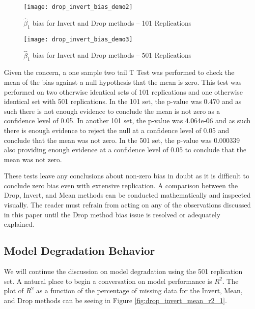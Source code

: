 \documentclass[../paper.tex]{subfiles}
\begin{document}
\begin{figure}[H]

\centering
\texttt{[image: drop\_invert\_bias\_demo2]}
\caption{$\hat{\beta}_{1}$ bias for Invert and Drop methods -- 101 Replications}
\label{fig:drop_invert_bias_demo2}
\end{figure}

\begin{figure}[H]

\centering
\texttt{[image: drop\_invert\_bias\_demo3]}
\caption{$\hat{\beta}_{1}$  bias for Invert and Drop methods -- 501 Replications}
\label{fig:drop_invert_bias_demo3}
\end{figure}

Given the concern, a one sample two tail T Test was performed to check the mean of the bias against a null hypothesis that the mean is zero.
This test was performed on two otherwise identical sets of 101 replications and one otherwise identical set with 501 replications.
In the 101 set, the p-value was 0.470 and as such there is not enough evidence to conclude the mean is not zero as a confidence level of 0.05.
In another 101 set, the p-value was 4.064e-06 and as such there is enough evidence to reject the null at a confidence level of 0.05 and conclude that the mean was not zero.
In the 501 set, the p-value was 0.000339 also providing enough evidence at a confidence level of 0.05 to conclude that the mean was not zero.

These tests leave any conclusions about non-zero bias in doubt as it is difficult to conclude zero bias even with extensive replication. A comparison between the Drop, Invert, and Mean methods can be conducted mathematically and inspected visually. The reader must refrain from acting on any of the observations discussed in this paper until the Drop method bias issue is resolved or adequately explained.

\subsection{Model Degradation Behavior}
We will continue the discussion on model degradation using the 501 replication set.
A natural place to begin a conversation on model performance is $R^2$.
The plot of $R^2$ as a function of the percentage of missing data for the Invert, Mean, and Drop methods can be seeing in Figure \ref{fig:drop_invert_mean_r2_1}.
\end{document}
